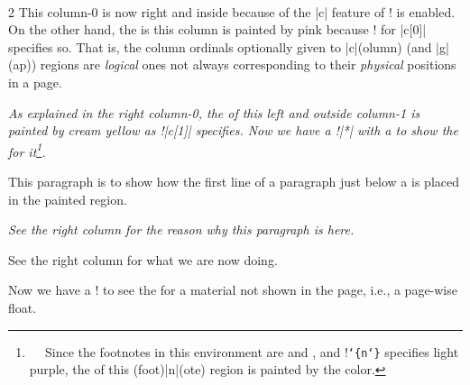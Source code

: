 \par\bigskip

\begin{paracol}{2}
This column-0 is now right and inside because of the |c| feature of
\!\twosided! is enabled.  On the other hand, the \bground{} is this column
is painted by pink because \!\backgroundcolor! for |c[0]| specifies so.
That is, the column ordinals optionally given to |c|(olumn) (and |g|(ap))
regions are \emph{logical} ones not always corresponding to their
\emph{physical} positions in a page.

\switchcolumn
\begingroup\it
As explained in the right column-0, the \bground{} of this left and
outside column-1 is painted by cream yellow as
{\rm\!\backgroundcolor!|{c[1]}|} specifies.  Now we have a
{\rm\!\switchcolumn!|*|} with a \mctext{} to show the \bgpaint{} for
it\footnote{

Since the footnotes in this  environment are \scfnote{} and
\mgfnote{}, and \!\backgroundcolor!\texttt{\char`\{n\char`\}} specifies
light purple, the \bground{} of this (foot)|n|(ote) region is painted by
the color.}.

\par\endgroup
{}


This paragraph is to show how the first line of a paragraph just below a
\mctext{} is placed in the painted region.
\par\vfill

\switchcolumn
\begingroup\it
See the right column for the reason why this paragraph is here.
\par\vfill

See the right column for what we are now doing.
\par\endgroup
\switchcolumn

Now we have a \!\flushpage! to see the \bgpaint{} for a material not shown
in the page, i.e., a page-wise float.
\flushpage


\end{paracol}
